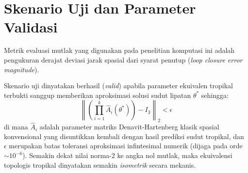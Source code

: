 \section{Skenario Uji dan Parameter Validasi}
Metrik evaluasi mutlak yang digunakan pada penelitian komputasi ini adalah pengukuran derajat deviasi jarak spasial dari syarat penutup (\textit{loop closure error magnitude}).

Skenario uji dinyatakan berhasil (\textit{valid}) apabila parameter ekuivalen tropikal terbukti sanggup memberikan aproksimasi solusi sudut lipatan $\theta^*$ sehingga:
\begin{equation}
  \left\| \left( \prod_{i=1}^{k} \hat{A}_i (\theta^*) \right) - I_3 \right\|_2 < \epsilon
\end{equation}
di mana $\hat{A}_i$ adalah parameter matriks Denavit-Hartenberg klasik spasial konvensional yang disuntikkan kembali dengan hasil prediksi sudut tropikal, dan $\epsilon$ merupakan batas toleransi aproksimasi infintesimal numerik (dijaga pada orde $\sim 10^{-6}$). Semakin dekat nilai norma-$2$ ke angka nol mutlak, maka ekuivalensi topologis tropikal dinyatakan semakin \textit{isometrik} secara mekanis.

